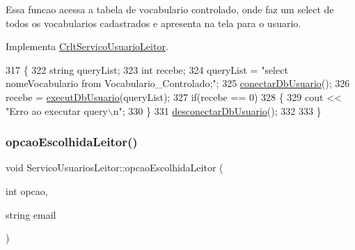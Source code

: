 Essa funcao acessa a tabela de vocabulario controlado, onde faz um select de todos os vocabularios cadastrados e apresenta na tela para o usuario.

Implementa \mbox{\hyperlink{class_crlt_servico_usuario_leitor_acfe203ebb5de6884bd4eb5d6167c781f}{Crlt\+Servico\+Usuario\+Leitor}}.


\begin{DoxyCode}
317 \{
322   \textcolor{keywordtype}{string} queryList;
323   \textcolor{keywordtype}{int} recebe;
324   queryList = \textcolor{stringliteral}{"select nomeVocabulario from Vocabulario\_Controlado;"};
325   \mbox{\hyperlink{comando_sql_8cpp_a4f89ddcbc4cf8f2587d89f72f8c7900d}{conectarDbUsuario}}();
326   recebe = \mbox{\hyperlink{comando_sql_8cpp_a748197580e7f9acdbf48c78de1f7924b}{executDbUsuario}}(queryList);
327   \textcolor{keywordflow}{if}(recebe == 0)
328   \{
329     cout << \textcolor{stringliteral}{"Erro ao executar query\(\backslash\)n"};
330   \}
331   \mbox{\hyperlink{comando_sql_8cpp_a969be9911913568e30d4ae8963338bc3}{desconectarDbUsuario}}();
332 
333 \}
\end{DoxyCode}
\mbox{\label{class_servico_usuarios_leitor_a9a8e9ac18739ef8e75f670236ba90c20}} 
\subsubsection{\texorpdfstring{opcao\+Escolhida\+Leitor()}{opcaoEscolhidaLeitor()}}
{\footnotesize\ttfamily void Servico\+Usuarios\+Leitor\+::opcao\+Escolhida\+Leitor (\begin{DoxyParamCaption}\item[{int}]{opcao,  }\item[{string}]{email }\end{DoxyParamCaption})}

